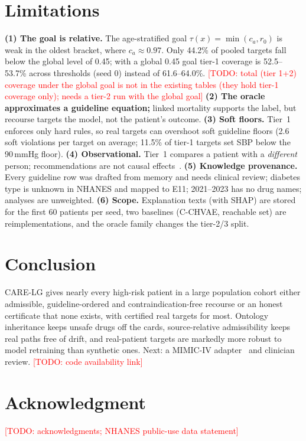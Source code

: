 \documentclass[conference]{IEEEtran}
\newcommand{\todo}[1]{\textcolor{red}{[TODO: #1]}}
\newcommand{\method}{CARE-LG}
\begin{document}
\section{Limitations}
\textbf{(1) The goal is relative.} The age-stratified goal $\tau(x)=\min(c_{a},r_0)$ is weak in the oldest bracket, where $c_a\approx0.97$. Only 44.2\% of pooled targets fall below the global level of 0.45; with a global 0.45 goal tier-1 coverage is 52.5--53.7\% across thresholds (seed 0) instead of 61.6--64.0\%. \todo{total (tier 1+2) coverage under the global goal is not in the existing tables (they hold tier-1 coverage only); needs a tier-2 run with the global goal}
\textbf{(2) The oracle approximates a guideline equation;} linked mortality supports the label, but recourse targets the model, not the patient's outcome.
\textbf{(3) Soft floors.} Tier~1 enforces only hard rules, so real targets can overshoot soft guideline floors (2.6 soft violations per target on average; 11.5\% of tier-1 targets set SBP below the 90\,mmHg floor).
\textbf{(4) Observational.} Tier~1 compares a patient with a \emph{different} person; recommendations are not causal effects~\cite{prosperi2020causal}.
\textbf{(5) Knowledge provenance.} Every guideline row was drafted from memory and needs clinical review; diabetes type is unknown in NHANES and mapped to E11; 2021--2023 has no drug names; analyses are unweighted.
\textbf{(6) Scope.} Explanation texts (with SHAP) are stored for the first 60 patients per seed, two baselines (C-CHVAE, reachable set) are reimplementations, and the oracle family changes the tier-2/3 split.

\section{Conclusion}
\method{} gives nearly every high-risk patient in a large population cohort either admissible, guideline-ordered and contraindication-free recourse or an honest certificate that none exists, with certified real targets for most. Ontology inheritance keeps unsafe drugs off the cards, source-relative admissibility keeps real paths free of drift, and real-patient targets are markedly more robust to model retraining than synthetic ones. Next: a MIMIC-IV adapter~\cite{johnson2023mimiciv} and clinician review. \todo{code availability link}

\section*{Acknowledgment}
\todo{acknowledgments; NHANES public-use data statement}



\end{document}

